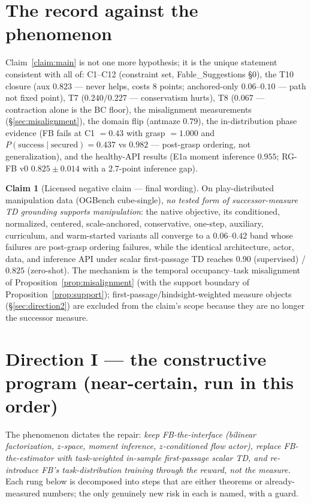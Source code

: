 \documentclass[11pt]{article}
\theoremstyle{definition}
\newtheorem{claim}{Claim}
\theoremstyle{remark}
\begin{document}
\section{The record against the phenomenon}\label{sec:record}

Claim~\ref{claim:main} is not one more hypothesis; it is the unique statement consistent with
all of: C1--C12 (constraint set, Fable\_Suggestions \S0), the T10 closure (aux $0.823$ ---
never helps, costs 8 points; anchored-only $0.06$--$0.10$ --- path not fixed point), T7
($0.240/0.227$ --- conservatism hurts), T8 ($0.067$ --- contraction alone is the BC floor),
the misalignment measurements (\S\ref{sec:misalignment}), the domain flip (antmaze $0.79$),
the in-distribution phase evidence (FB fails at C1 $=0.43$ with grasp $=1.000$ and
$P(\mathrm{success}\mid\mathrm{secured})=0.437$ vs $0.982$ --- post-grasp ordering, not
generalization), and the healthy-API results (E1a moment inference $0.955$; RG-FB v0
$0.825\pm0.014$ with a $2.7$-point inference gap).

\begin{claim}[Licensed negative claim --- final wording]\label{claim:negative}
On play-distributed manipulation data (OGBench cube-single), \emph{no tested form of
successor-measure TD grounding supports manipulation}: the native objective, its conditioned,
normalized, centered, scale-anchored, conservative, one-step, auxiliary, curriculum, and
warm-started variants all converge to a $0.06$--$0.42$ band whose failures are post-grasp
ordering failures, while the identical architecture, actor, data, and inference API under
scalar first-passage TD reaches $0.90$ (supervised) / $0.825$ (zero-shot). The mechanism is
the temporal occupancy--task misalignment of Proposition~\ref{prop:misalignment} (with the
support boundary of Proposition~\ref{prop:support}); first-passage/hindsight-weighted
measure objects (\S\ref{sec:direction2}) are excluded from the claim's scope because they
are no longer the successor measure.
\end{claim}

\section{Direction I --- the constructive program (near-certain, run in this
order)}\label{sec:direction1}

The phenomenon dictates the repair: \emph{keep FB-the-interface (bilinear factorization,
$z$-space, moment inference, $z$-conditioned flow actor), replace FB-the-estimator with
task-weighted in-sample first-passage scalar TD, and re-introduce FB's task-distribution
training through the reward, not the measure.} Each rung below is decomposed into steps that
are either theorems or already-measured numbers; the only genuinely new risk in each is
named, with a guard.
\end{document}
